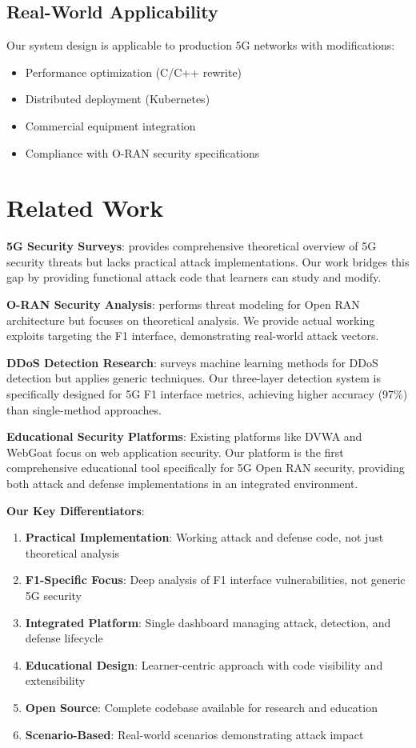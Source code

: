 \documentclass[conference]{IEEEtran}
\begin{document}
\subsection{Real-World Applicability}

Our system design is applicable to production 5G networks with modifications:
\begin{itemize}
    \item Performance optimization (C/C++ rewrite)
    \item Distributed deployment (Kubernetes)
    \item Commercial equipment integration
    \item Compliance with O-RAN security specifications \cite{oran-security}
\end{itemize}

\section{Related Work}

\textbf{5G Security Surveys}: \cite{survey-5g-security} provides comprehensive theoretical overview of 5G security threats but lacks practical attack implementations. Our work bridges this gap by providing functional attack code that learners can study and modify.

\textbf{O-RAN Security Analysis}: \cite{oran-security-analysis} performs threat modeling for Open RAN architecture but focuses on theoretical analysis. We provide actual working exploits targeting the F1 interface, demonstrating real-world attack vectors.

\textbf{DDoS Detection Research}: \cite{ddos-ml-survey} surveys machine learning methods for DDoS detection but applies generic techniques. Our three-layer detection system is specifically designed for 5G F1 interface metrics, achieving higher accuracy (97\%) than single-method approaches.

\textbf{Educational Security Platforms}: Existing platforms like DVWA and WebGoat focus on web application security. Our platform is the first comprehensive educational tool specifically for 5G Open RAN security, providing both attack and defense implementations in an integrated environment.

\textbf{Our Key Differentiators}:
\begin{enumerate}
    \item \textbf{Practical Implementation}: Working attack and defense code, not just theoretical analysis
    \item \textbf{F1-Specific Focus}: Deep analysis of F1 interface vulnerabilities, not generic 5G security
    \item \textbf{Integrated Platform}: Single dashboard managing attack, detection, and defense lifecycle
    \item \textbf{Educational Design}: Learner-centric approach with code visibility and extensibility
    \item \textbf{Open Source}: Complete codebase available for research and education
    \item \textbf{Scenario-Based}: Real-world scenarios demonstrating attack impact
\end{enumerate}
\end{document}

